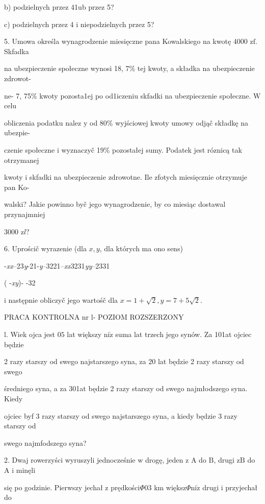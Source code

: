 \documentclass[a4paper,12pt]{article}
\begin{document}
b) podzielnych przez 41ub przez 5?

c) podzielnych przez 4 $\mathrm{i}$ niepodzielnych przez 5?

5. Umowa określa wynagrodzenie miesięczne pana Kowalskiego na kwotę 4000 $\mathrm{z}\mathrm{f}$. Skfadka

na ubezpieczenie społeczne wynosi 18, 7\% tej kwoty, a składka na ubezpieczenie zdrowot-

ne- 7, 75\% kwoty pozosta1ej po od1iczeniu skfadki na ubezpieczenie społeczne. $\mathrm{W}$ celu

obliczenia podatku nalez $\mathrm{y}$ od 80\% wyjściowej kwoty umowy odjąč składkę na ubezpie-

czenie społeczne $\mathrm{i}$ wyznaczyč 19\% pozostałej sumy. Podatek jest róznicą tak otrzymanej

kwoty $\mathrm{i}$ skfadki na ubezpieczenie zdrowotne. Ile zfotych miesięcznie otrzymuje pan Ko-

walski? Jakie powinno byč jego wynagrodzenie, by co miesiąc dostawal przynajmniej

3000 $\mathrm{z}l$?

6. Uprościč wyrazenie (dla $x, y$, dla których ma ono sens)

-{\it xx}--23{\it y}-21-{\it y}--3221--{\it xx}3231{\it yy}--2331

( -{\it xy})- -32

$\mathrm{i}$ następnie obliczyč jego wartośč dla $x=1+\sqrt{2}, y=7+5\sqrt{2}.$




PRACA KONTROLNA nr l- POZIOM ROZSZERZONY

l. Wiek ojca jest $05$ lat większy $\mathrm{n}\mathrm{i}\dot{\mathrm{z}}$ suma lat trzech jego synów. Za 101at ojciec będzie

2 razy starszy od swego najstarszego syna, za 20 lat będzie 2 razy starszy od swego

średniego syna, a za 301at będzie 2 razy starszy od swego najmłodszego syna. Kiedy

ojciec byf 3 razy starszy od swego najstarszego syna, a kiedy będzie 3 razy starszy od

swego najmfodszego syna?

2. Dwaj rowerzyści wyruszyli jednocześnie $\mathrm{w}$ drogę, jeden $\mathrm{z}$ A do $\mathrm{B}$, drugi $\mathrm{z}\mathrm{B}$ do A $\mathrm{i}$ minęli

się po godzinie. Pierwszy jechał $\mathrm{z}$ prędkości$\Phi 03$ km większ$\Phi \mathrm{n}\mathrm{i}\dot{\mathrm{z}}$ drugi $\mathrm{i}$ przyjechał do
\end{document}
